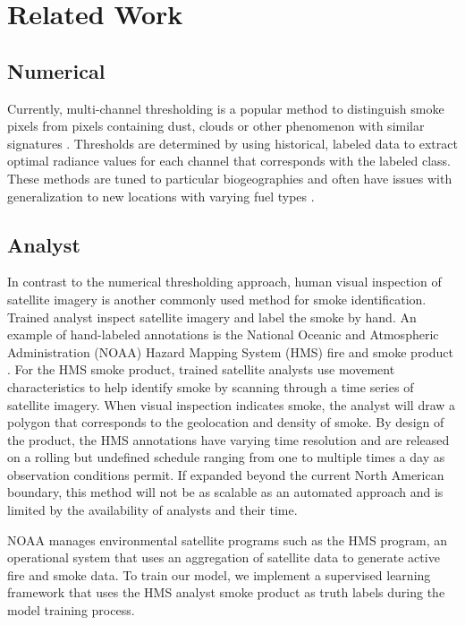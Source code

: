 \section{Related Work}
\label{sec:formatting}


\subsection{Numerical}

Currently, multi-channel thresholding is a popular method to distinguish smoke pixels from pixels containing dust, clouds or other phenomenon with similar signatures \cite{threshold}. Thresholds are determined by using historical, labeled data to extract optimal radiance values for each channel that corresponds with the labeled class. These methods are tuned to particular biogeographies and often have issues with generalization to new locations with varying fuel types \cite{thresh_geog}.

\subsection{Analyst} 
In contrast to the numerical thresholding approach, human visual inspection of satellite imagery is another commonly used method for smoke identification. Trained analyst inspect satellite imagery and label the smoke by hand. An example of hand-labeled annotations is the National Oceanic and Atmospheric Administration (NOAA) Hazard Mapping System (HMS) fire and smoke product \cite{hms, hms_val}. For the HMS smoke product, trained satellite analysts use movement characteristics to help identify smoke by scanning through a time series of satellite imagery. When visual inspection indicates smoke, the analyst will draw a polygon that corresponds to the geolocation and density of smoke. By design of the product, the HMS annotations have varying time resolution and are released on a rolling but undefined schedule ranging from one to multiple times a day as observation conditions permit. If expanded beyond the current North American boundary, this method will not be as scalable as an automated approach and is limited by the availability of analysts and their time. 

NOAA manages environmental satellite programs such as the HMS program, an operational system that uses an aggregation of satellite data to generate active fire and smoke data. To train our model, we implement a supervised learning framework that uses the HMS analyst smoke product as truth labels during the model training process.

